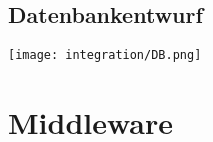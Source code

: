 \documentclass{scrartcl}
\begin{document}
\subsection{Datenbankentwurf}
\texttt{[image: integration/DB.png]}
\newpage

\section{Middleware}
\end{document}
